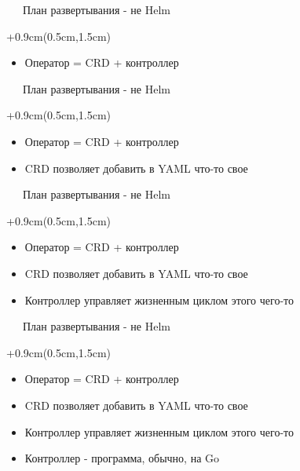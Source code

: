 \documentclass[xetex,18pt,aspectratio=43]{beamer}
\begin{document}
\begin{Large}
\begin{frame}{\ \ \ План развертывания - не Helm}
\begin{textblock*}{\framewidth+0.9cm}(0.5cm,1.5cm)
\begin{itemize}
  \item Оператор = CRD + контроллер
\end{itemize}
\end{textblock*}
\end{frame}

\begin{frame}{\ \ \ План развертывания - не Helm}
\begin{textblock*}{\framewidth+0.9cm}(0.5cm,1.5cm)
\begin{itemize}
  \item Оператор = CRD + контроллер
  \item CRD позволяет добавить в YAML что-то свое
\end{itemize}
\end{textblock*}
\end{frame}

\begin{frame}{\ \ \ План развертывания - не Helm}
\begin{textblock*}{\framewidth+0.9cm}(0.5cm,1.5cm)
\begin{itemize}
  \item Оператор = CRD + контроллер
  \item CRD позволяет добавить в YAML что-то свое
  \item Контроллер управляет жизненным циклом этого чего-то
\end{itemize}
\end{textblock*}
\end{frame}

\begin{frame}{\ \ \ План развертывания - не Helm}
\begin{textblock*}{\framewidth+0.9cm}(0.5cm,1.5cm)
\begin{itemize}
  \item Оператор = CRD + контроллер
  \item CRD позволяет добавить в YAML что-то свое
  \item Контроллер управляет жизненным циклом этого чего-то
  \item Контроллер - программа, обычно, на Go
\end{itemize}
\end{textblock*}
\end{frame}


\end{Large}
\end{document}
